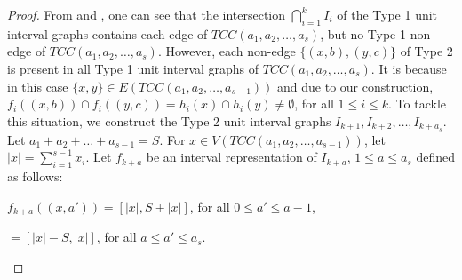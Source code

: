 \documentclass[twoside, 11pt]{article}
\newcommand{\T}{TCC(a_1,a_2,\dots,a_{s-1})}
\newcommand{\TT}{TCC(a_1,a_2,\dots,a_s)}
\newcommand{\G}{\Gamma}
\begin{document}
\begin{proof}
From  and , one can see that the intersection $\bigcap_{i=1}^k I_i$ of the Type 1 unit interval graphs contains each edge of $\TT$, but no Type 1 non-edge of $\TT$.  %
However, each non-edge $\{(x,b),(y,c)\}$ of Type 2 is present in all Type 1 unit interval graphs of $\TT$. It is because in this case $\{x,y\} \in E(\T)$ and due to our construction, $f_i((x,b)) \cap f_i((y,c)) =h_i(x) \cap h_i(y) \neq \emptyset$, for all $1 \leq i \leq k$. To tackle this situation, we construct the Type 2 unit interval graphs $I_{k+1}, I_{k+2}, \dots, I_{k+a_s}$. Let $a_1+ a_2 + \dots + a_{s-1}=S$. For $x \in V(\T)$, let $|x|=\sum_{i=1}^{s-1}x_i$. Let $f_{k+a}$ be an interval representation of $I_{k+a}$, $1 \leq a \leq a_s$ defined as follows:

\begin{center}
    $f_{k+a}((x,a')) = [|x|,S+|x|]$, for all $0 \leq a' \leq a-1$,

     \hspace{1.4cm}        $= [|x|-S,|x|]$, for all $a \leq a' \leq a_s$.

\end{center}



     

\end{proof}
\end{document}
